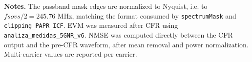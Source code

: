 \documentclass[8pt]{article}
\begin{document}
\vspace{0.8em}

\textbf{Notes.}
The passband mask edges are normalized to Nyquist, i.e. to $fsovs/2 = 245.76$ MHz, matching the format consumed by \texttt{spectrumMask} and \texttt{clipping\_PAPR\_ICF}. EVM was measured after CFR using \texttt{analiza\_medidas\_5GNR\_v6}. NMSE was computed directly between the CFR output and the pre-CFR waveform, after mean removal and power normalization. Multi-carrier values are reported per carrier.
\end{document}
